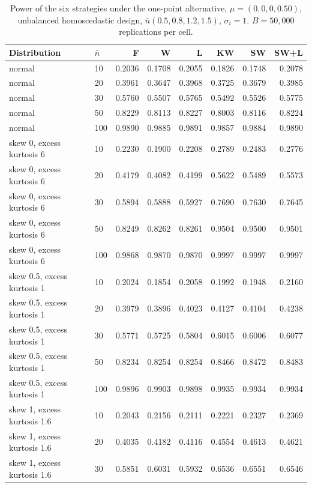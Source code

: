 \begin{table}[htbp]
\centering
\caption{Power of the six strategies under the one-point alternative, $\mu = (0, 0, 0, 0.50)$, unbalanced homoscedastic design, $\bar n(0.5, 0.8, 1.2, 1.5)$, $\sigma_i = 1$. $B = 50{,}000$ replications per cell.}
\begin{tabular}{llrrrrrr}
\hline
Distribution & $\bar n$ & F & W & L & KW & SW & SW+L \\
\hline
normal &  10 & 0.2036 & 0.1708 & 0.2055 & 0.1826 & 0.1748 & 0.2078 \\
normal &  20 & 0.3961 & 0.3647 & 0.3968 & 0.3725 & 0.3679 & 0.3985 \\
normal &  30 & 0.5760 & 0.5507 & 0.5765 & 0.5492 & 0.5526 & 0.5775 \\
normal &  50 & 0.8229 & 0.8113 & 0.8227 & 0.8003 & 0.8116 & 0.8224 \\
normal & 100 & 0.9890 & 0.9885 & 0.9891 & 0.9857 & 0.9884 & 0.9890 \\
skew 0, excess kurtosis 6 &  10 & 0.2230 & 0.1900 & 0.2208 & 0.2789 & 0.2483 & 0.2776 \\
skew 0, excess kurtosis 6 &  20 & 0.4179 & 0.4082 & 0.4199 & 0.5622 & 0.5489 & 0.5573 \\
skew 0, excess kurtosis 6 &  30 & 0.5894 & 0.5888 & 0.5927 & 0.7690 & 0.7630 & 0.7645 \\
skew 0, excess kurtosis 6 &  50 & 0.8249 & 0.8262 & 0.8261 & 0.9504 & 0.9500 & 0.9501 \\
skew 0, excess kurtosis 6 & 100 & 0.9868 & 0.9870 & 0.9870 & 0.9997 & 0.9997 & 0.9997 \\
skew 0.5, excess kurtosis 1 &  10 & 0.2024 & 0.1854 & 0.2058 & 0.1992 & 0.1948 & 0.2160 \\
skew 0.5, excess kurtosis 1 &  20 & 0.3979 & 0.3896 & 0.4023 & 0.4127 & 0.4104 & 0.4238 \\
skew 0.5, excess kurtosis 1 &  30 & 0.5771 & 0.5725 & 0.5804 & 0.6015 & 0.6006 & 0.6077 \\
skew 0.5, excess kurtosis 1 &  50 & 0.8234 & 0.8254 & 0.8254 & 0.8466 & 0.8472 & 0.8483 \\
skew 0.5, excess kurtosis 1 & 100 & 0.9896 & 0.9903 & 0.9898 & 0.9935 & 0.9934 & 0.9934 \\
skew 1, excess kurtosis 1.6 &  10 & 0.2043 & 0.2156 & 0.2111 & 0.2221 & 0.2327 & 0.2369 \\
skew 1, excess kurtosis 1.6 &  20 & 0.4035 & 0.4182 & 0.4116 & 0.4554 & 0.4613 & 0.4621 \\
skew 1, excess kurtosis 1.6 &  30 & 0.5851 & 0.6031 & 0.5932 & 0.6536 & 0.6551 & 0.6546 \\

\end{tabular}
\end{table}
